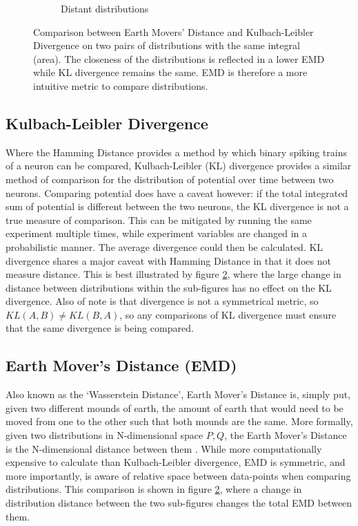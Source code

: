 \begin{figure}[t]
\begin{subfigure}{.5\textwidth}
        \caption{Distant distributions}
        \label{fig:fardist}
    \end{subfigure}
    \caption[Comparison between Earth Mover Distance and Kulbach-Leibler Divergence]{Comparison between Earth Movers' Distance and Kulbach-Leibler Divergence on two pairs of distributions with the same integral (area). The closeness of the distributions is reflected in a lower EMD while KL divergence remains the same. EMD is therefore a more intuitive metric to compare distributions.}
    \label{fig:distributioncompKLEMD}
\end{figure}

\subsection{Kulbach-Leibler Divergence}

Where the Hamming Distance provides a method by which binary spiking trains of a
neuron can be compared, Kulbach-Leibler (KL) divergence provides a similar
method of comparison for the distribution of potential over time between two
neurons. Comparing potential does have a caveat however: if the total integrated
sum of potential is different between the two neurons, the KL divergence is not
a true measure of comparison. This can be mitigated by running the same
experiment multiple times, while experiment variables are changed in a
probabilistic manner. The average divergence could then be calculated. KL
divergence shares a major caveat with Hamming Distance in that it does not
measure distance. This is best illustrated by figure
\ref{fig:distributioncompKLEMD}, where the large change in distance between
distributions within the sub-figures has no effect on the KL divergence. Also of
note is that divergence is not a symmetrical metric, so $KL(A, B) \neq KL(B,
A)$, so any comparisons of KL divergence must ensure that the same divergence is
being compared.

\subsection{Earth Mover's Distance (EMD)}

Also known as the `Wasserstein Distance', Earth Mover's Distance is, simply put,
given two different mounds of earth, the amount of earth that would need to be
moved from one to the other such that both mounds are the same. More formally,
given two distributions in N-dimensional space $P, Q$, the Earth Mover's
Distance is the N-dimensional distance between them \autocite{pele_fast_2009}. While more computationally
expensive to calculate than Kulbach-Leibler divergence, EMD is symmetric, and
more importantly, is aware of relative space between data-points when comparing
distributions. This comparison is shown in figure
\ref{fig:distributioncompKLEMD}, where a change in distribution distance between
the two sub-figures changes the total EMD between them.
